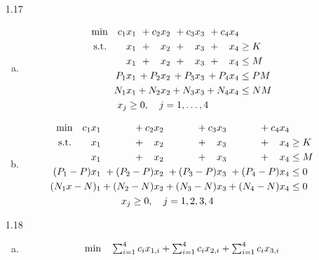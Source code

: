 \documentclass[a4paper,10pt]{article}
\theoremstyle{definition}
\begin{document}
\begin{enumerate}
\item[1.17]
\begin{enumerate}[(a)]
\item
\begin{align*}
  \begin{array}{r@{}r@{}r@{}r@{}l}
    \text{min} \quad c_1x_1 &{} + c_2x_2&{}+ c_3x_3&{}+ c_4x_4&{} \\[\jot]
    \text{s.t.}\qquad x_1 &{} +\phantom{c_2}x_2 &{} + \phantom{c_3}x_3 &{}+\phantom{c_3} x_4&{}  \geq K\\ [\jot]
    x_1 &{} +\phantom{c_2}x_2 &{} + \phantom{c_3}x_3 &{}+\phantom{c_3} x_4&{}  \leq M\\ [\jot]
P_1x_1 &{}+P_2x_2 &{}+P_3x_3 &{}+P_4x_4 &{}\leq PM\\        [\jot]          
N_1x_1 &{}+N_2x_2 &{}+N_3x_3 &{}+N_4x_4 &{}\leq NM\\    [\jot]              
 \multicolumn{4}{c}{x_j \geq 0, \quad j=1,\ldots,4}
  \end{array}
\end{align*}
\item
\begin{align*}
  \begin{array}{r@{}r@{}r@{}r@{}l}
    \text{min} \quad c_1x_1 &{} + c_2x_2&{}+ c_3x_3&{}+ c_4x_4&{} \\[\jot]
    \text{s.t.}\qquad x_1 &{} +\phantom{c_2}x_2 &{} + \phantom{c_3}x_3 &{}+\phantom{c_3} x_4&{}  \geq K\\ [\jot]
    x_1 &{} +\phantom{c_2}x_2 &{} + \phantom{c_3}x_3 &{}+\phantom{c_3} x_4&{}  \leq M\\ [\jot]
(P_1-P)x_1 &{}+(P_2-P)x_2 &{}+(P_3-P)x_3 &{}+(P_4-P)x_4 &{}\leq 0\\        [\jot]          
(N_1x-N)_1 &{}+(N_2-N)x_2 &{}+(N_3-N)x_3 &{}+(N_4-N)x_4 &{}\leq 0\\    [\jot]              
 \multicolumn{4}{c}{x_j \geq 0, \quad j=1,2,3,4}
  \end{array}
\end{align*}
\end{enumerate}
\item[1.18]
\begin{enumerate}[(a)]
\item
\begin{align*}
  \begin{array}{r@{}r@{}r@{}l}
    \text{min} \quad \sum_{i=1}^{4}c_ix_{1,i} &{} + \sum_{i=1}^{4}c_ix_{2,i}&{}+ \sum_{i=1}^{4}c_ix_{3,i}&{} \\[\jot]

\end{array}
\end{align*}
\end{enumerate}
\end{enumerate}
\end{document}
